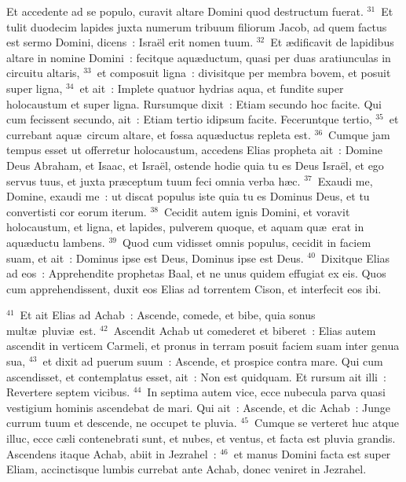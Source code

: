  Et accedente ad se populo, curavit altare Domini quod destructum fuerat.
${}^{31}$~Et tulit duodecim lapides juxta numerum tribuum filiorum Jacob, ad quem factus est sermo Domini, dicens~: Isra\"el erit nomen tuum.
${}^{32}$~Et \ae dificavit de lapidibus altare in nomine Domini~: fecitque aqu\ae ductum, quasi per duas aratiunculas in circuitu altaris,
${}^{33}$~et composuit ligna~: divisitque per membra bovem, et posuit super ligna,
${}^{34}$~et ait~: Implete quatuor hydrias aqua, et fundite super holocaustum et super ligna. Rursumque dixit~: Etiam secundo hoc facite. Qui cum fecissent secundo, ait~: Etiam tertio idipsum facite. Feceruntque tertio,
${}^{35}$~et currebant aqu\ae\ circum altare, et fossa aqu\ae ductus repleta est.
${}^{36}$~Cumque jam tempus esset ut offerretur holocaustum, accedens Elias propheta ait~: Domine Deus Abraham, et Isaac, et Isra\"el, ostende hodie quia tu es Deus Isra\"el, et ego servus tuus, et juxta pr\ae ceptum tuum feci omnia verba h\ae c.
${}^{37}$~Exaudi me, Domine, exaudi me~: ut discat populus iste quia tu es Dominus Deus, et tu convertisti cor eorum iterum.
${}^{38}$~Cecidit autem ignis Domini, et voravit holocaustum, et ligna, et lapides, pulverem quoque, et aquam qu\ae\ erat in aqu\ae ductu lambens.
${}^{39}$~Quod cum vidisset omnis populus, cecidit in faciem suam, et ait~: Dominus ipse est Deus, Dominus ipse est Deus.
${}^{40}$~Dixitque Elias ad eos~: Apprehendite prophetas Baal, et ne unus quidem effugiat ex eis. Quos cum apprehendissent, duxit eos Elias ad torrentem Cison, et interfecit eos ibi.


${}^{41}$~Et ait Elias ad Achab~: Ascende, comede, et bibe, quia sonus mult\ae\ pluvi\ae\ est.
${}^{42}$~Ascendit Achab ut comederet et biberet~: Elias autem ascendit in verticem Carmeli, et pronus in terram posuit faciem suam inter genua sua,
${}^{43}$~et dixit ad puerum suum~: Ascende, et prospice contra mare. Qui cum ascendisset, et contemplatus esset, ait~: Non est quidquam. Et rursum ait illi~: Revertere septem vicibus.
${}^{44}$~In septima autem vice, ecce nubecula parva quasi vestigium hominis ascendebat de mari. Qui ait~: Ascende, et dic Achab~: Junge currum tuum et descende, ne occupet te pluvia.
${}^{45}$~Cumque se verteret huc atque illuc, ecce c\ae li contenebrati sunt, et nubes, et ventus, et facta est pluvia grandis. Ascendens itaque Achab, abiit in Jezrahel~:
${}^{46}$~et manus Domini facta est super Eliam, accinctisque lumbis currebat ante Achab, donec veniret in Jezrahel.

